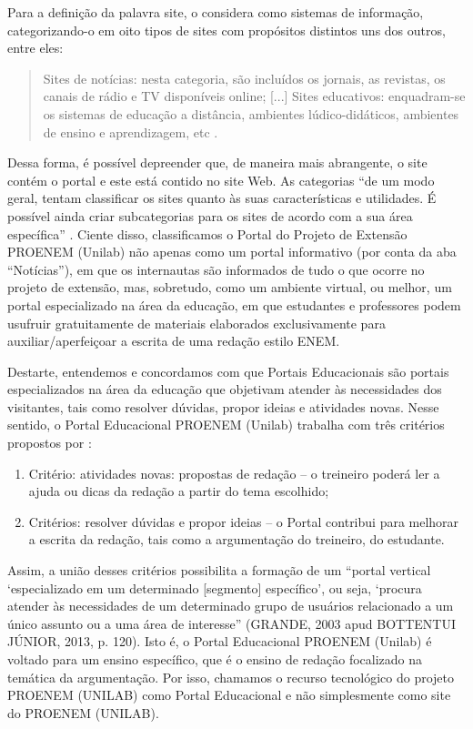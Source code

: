 \documentclass{textolivre}
\newcounter{quote}
\begin{document}
Para a definição da palavra site, \textcite{goncalves2002} o considera como sistemas de informação, categorizando-o em oito tipos de sites com propósitos distintos uns dos outros, entre eles: 

\begin{quote}
Sites de notícias: nesta categoria, são incluídos os jornais, as revistas, os canais de rádio e TV disponíveis online; [...] Sites educativos: enquadram-se os sistemas de educação a distância, ambientes lúdico-didáticos, ambientes de ensino e aprendizagem, etc \cite[p. 115]{goncalves2002}. 
\end{quote}

Dessa forma, é possível depreender que, de maneira mais abrangente, o site contém o portal e este está contido no site Web. As categorias “de um modo geral, tentam classificar os sites quanto às suas características e utilidades. É possível ainda criar subcategorias para os sites de acordo com a sua área específica” \cite[p. 116]{bottentuitjunior2013}. Ciente disso, classificamos o Portal do Projeto de Extensão PROENEM (Unilab) não apenas como um portal informativo (por conta da aba “Notícias”), em que os internautas são informados de tudo o que ocorre no projeto de extensão, mas, sobretudo, como um ambiente virtual, ou melhor, um portal especializado na área da educação, em que estudantes e professores podem usufruir gratuitamente de materiais elaborados exclusivamente para auxiliar/aperfeiçoar a escrita de uma redação estilo ENEM. 

Destarte, entendemos e concordamos com \textcite{iahn2001} que Portais Educacionais são portais especializados na área da educação que objetivam atender às necessidades dos visitantes, tais como resolver dúvidas, propor ideias e atividades novas. Nesse sentido, o Portal Educacional PROENEM (Unilab) trabalha com três critérios propostos por \textcite{iahn2001}:

\begin{enumerate}[label=(\Alph*)]
\item Critério: atividades novas: propostas de redação – o treineiro poderá ler a ajuda ou dicas da redação a partir do tema escolhido;
\item Critérios: resolver dúvidas e propor ideias – o Portal contribui para melhorar a escrita da redação, tais como a argumentação do treineiro, do estudante. 
\end{enumerate}

Assim, a união desses critérios possibilita a formação de um “portal vertical ‘especializado em um determinado [segmento] específico’, ou seja, ‘procura atender às necessidades de um determinado grupo de usuários relacionado a um único assunto ou a uma área de interesse” (GRANDE, 2003 apud BOTTENTUI JÚNIOR, 2013, p. 120). Isto é, o Portal Educacional PROENEM (Unilab) é voltado para um ensino específico, que é o ensino de redação focalizado na temática da argumentação. Por isso, chamamos o recurso tecnológico do projeto PROENEM (UNILAB) como Portal Educacional e não simplesmente como site do PROENEM (UNILAB).
\end{document}

